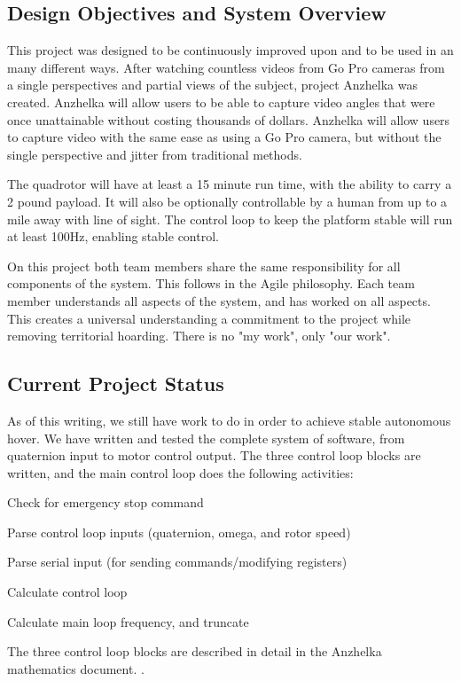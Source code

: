 \documentclass{article}
\numberwithin{equation}{section} %
\begin{document}

\subsection{Design Objectives and System Overview}

This project was designed to be continuously improved upon and to be used in an many different ways. After watching countless videos from Go Pro cameras from a single perspectives and partial views of the subject, project Anzhelka was created. Anzhelka will allow users to be able to capture video angles that were once unattainable without costing thousands of dollars. Anzhelka will allow users to capture video with the same ease as using a Go Pro camera, but without the single perspective and jitter from traditional methods.

The quadrotor will have at least a 15 minute run time, with the ability to carry a 2 pound payload. It will also be optionally controllable by a human from up to a mile away with line of sight. The control loop to keep the platform stable will run at least 100Hz, enabling stable control.

On this project both team members share the same responsibility for all components of the system. This follows in the Agile philosophy. Each team member understands all aspects of the system, and has worked on all aspects. This creates a universal understanding a commitment to the project while removing territorial hoarding. There is no "my work", only "our work".

\subsection{Current Project Status}
As of this writing, we still have work to do in order to achieve stable autonomous hover. We have written and tested the complete system of software, from quaternion input to motor control output. The three control loop blocks are written, and the main control loop does the following activities:
\begin{list}{*}{}
	\item Check for emergency stop command
	\item Parse control loop inputs (quaternion, omega, and rotor speed)
	\item Parse serial input (for sending commands/modifying registers)
	\item Calculate control loop
	\item Calculate main loop frequency, and truncate
\end{list}
The three control loop blocks are described in detail in the Anzhelka mathematics document. \cite{anzhelka_math}.
\end{document}
